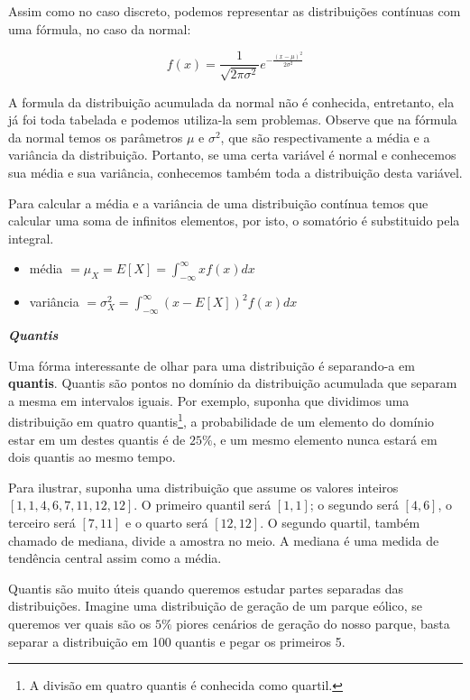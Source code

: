 Assim como no caso discreto, podemos representar as distribuições contínuas com uma fórmula, no caso da normal:

\begin{equation}
f(x)=\frac{1}{\sqrt{2 \pi \sigma^2}} e^{-\frac{(x-\mu)^2}{2\sigma^2}}
\end{equation}

A formula da distribuição acumulada da normal não é conhecida, entretanto, ela já foi toda tabelada e podemos utiliza-la sem problemas. Observe que na fórmula da normal temos os parâmetros $\mu$ e $\sigma^2$, que são respectivamente a média e a variância da distribuição. Portanto, se uma certa variável é normal e conhecemos sua média e sua variância, conhecemos também toda a distribuição desta variável.

Para calcular a média e a variância de uma distribuição contínua temos que calcular uma soma de infinitos elementos, por isto, o somatório é substituido pela integral.

\begin{itemize}
\item média $=\mu_X =E[X]=\int_{-\infty}^{\infty} xf(x)dx$
\item variância $=\sigma^2_X=\int_{-\infty}^{\infty} (x-E[X])^2 f(x)dx$  \end{itemize}

\textbf{\textit{Quantis}}

Uma fórma interessante de olhar para uma distribuição é separando-a em \textbf{quantis}. Quantis são pontos no domínio da distribuição acumulada que separam a mesma em intervalos iguais. Por exemplo, suponha que dividimos uma distribuição em quatro quantis\footnote{A divisão em quatro quantis é conhecida como quartil.}, a probabilidade de um elemento do domínio estar em um destes quantis é de $25\%$, e um mesmo elemento nunca estará em dois quantis ao mesmo tempo. 

Para ilustrar, suponha uma distribuição que assume os valores inteiros $[1,1,4,6,7,11,12,12]$. O primeiro quantil será $[1,1]$; o segundo será $[4,6]$, o terceiro será $[7,11]$ e o quarto será $[12,12]$. O segundo quartil, também chamado de mediana, divide a amostra no meio. A mediana é uma medida de tendência central assim como a média.

Quantis são muito úteis quando queremos estudar partes separadas das distribuições. Imagine uma distribuição de geração de um parque eólico, se queremos ver quais são os $5\%$ piores cenários de geração do nosso parque, basta separar a distribuição em 100 quantis e pegar os primeiros 5.
